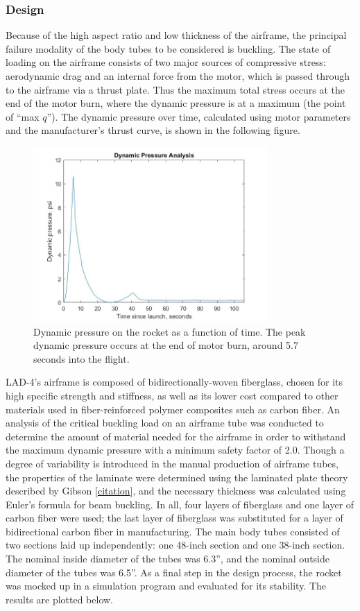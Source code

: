 \subsubsection*{Design}
Because of the high aspect ratio and low thickness of the airframe, the principal failure modality of the body tubes to be considered is buckling. The state of loading on the airframe consists of two major sources of compressive stress: aerodynamic drag and an internal force from the motor, which is passed through to the airframe via a thrust plate. Thus the maximum total stress occurs at the end of the motor burn, where the dynamic pressure is at a maximum (the point of “max $q$”). The dynamic pressure over time, calculated using motor parameters and the manufacturer’s thrust curve, is shown in the following figure.
\begin{figure}[H]
	\centering
	\includegraphics[width=3.5in]{imgs/dynamicpressurevtime.jpg}
	\caption{Dynamic pressure on the rocket as a function of time. The peak dynamic pressure occurs at the end of motor burn, around 5.7 seconds into the flight.}
	\label{fig:dynamicpressure}
\end{figure}
LAD-4’s airframe is composed of bidirectionally-woven fiberglass, chosen for its high specific strength and stiffness, as well as its lower cost compared to other materials used in fiber-reinforced polymer composites such as carbon fiber. An analysis of the critical buckling load on an airframe tube was conducted to determine the amount of material needed for the airframe in order to withstand the maximum dynamic pressure with a minimum safety factor of 2.0. Though a degree of variability is introduced in the manual production of airframe tubes, the properties of the laminate were determined using the laminated plate theory described by Gibson [\href{example.com}{citation}], and the necessary thickness was calculated using Euler’s formula for beam buckling. In all, four layers of fiberglass and one layer of carbon fiber were used; the last layer of fiberglass was substituted for a layer of bidirectional carbon fiber in manufacturing. The main body tubes consisted of two sections laid up independently: one 48-inch section and one 38-inch section. The nominal inside diameter of the tubes was 6.3”, and the nominal outside diameter of the tubes was 6.5”. As a final step in the design process, the rocket was mocked up in a simulation program and evaluated for its stability. The results are plotted below. 
